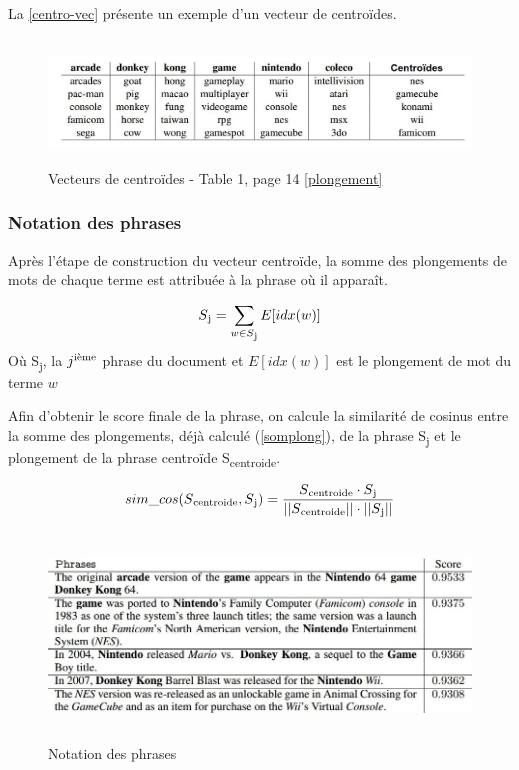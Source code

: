              \vspace*{0.5cm}
             La \autoref{centro-vec} présente un exemple d'un vecteur de centroïdes. 
              \begin{figure}[H]
                 \centering
                \includegraphics[height=95pt,width=420pt]{img/chapter3/centroideembed.jpg}
                \caption{Vecteurs de centroïdes - Table 1, page 14 \ref{plongement}}
                \label{centro-vec}
             \end{figure}

         \subsubsection{Notation des phrases}
         Après l'étape de construction du vecteur centroïde, la somme des plongements de mots de chaque terme  est attribuée à la phrase où il apparaît.\label{somplong}

        \begin{equation*}
         S\textsubscript{j} = \sum_{\substack{w\in S\textsubscript{j}}}
         E[idx(w)]
        \end{equation*}
        Où S\textsubscript{j}, la $j\textsuperscript{ième}$ phrase du document et $E[idx(w)]$ est le plongement de mot du terme $w$

        Afin d'obtenir le score finale de la phrase, on calcule la similarité de cosinus entre la somme des plongements, déjà calculé (\ref{somplong}), de la phrase S\textsubscript{j} et le plongement de la phrase centroïde S\textsubscript{centroide}.
        
        \[sim\_cos(S\textsubscript{centroide},S\textsubscript{j}) = \frac {S\textsubscript{centroide} \cdot S\textsubscript{j}}{||S\textsubscript{centroide}|| \cdot ||S\textsubscript{j}||}\]

            \begin{figure}[H]
                \centering
                \includegraphics[height=155pt,width=400pt]{img/chapter3/scoreembed.jpg}
                \caption{Notation des phrases}
                \label{Notation des phrases - Table 2, page 14 \ref{plongement}}
            \end{figure}

